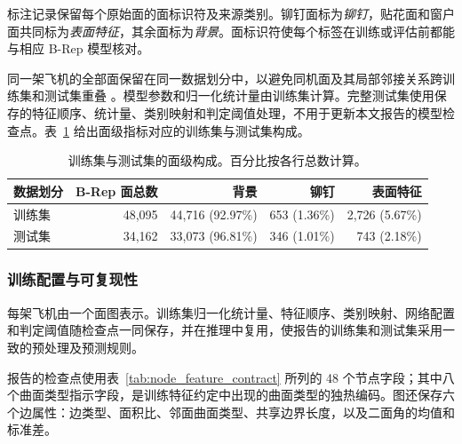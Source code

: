 \documentclass[12pt,a4paper]{ctexart}
\begin{document}
标注记录保留每个原始面的面标识符及来源类别。铆钉面标为\textit{铆钉}，贴花面和窗户面共同标为\textit{表面特征}，其余面标为\textit{背景}。面标识符使每个标签在训练或评估前都能与相应 B-Rep 模型核对。

同一架飞机的全部面保留在同一数据划分中，以避免同机面及其局部邻接关系跨训练集和测试集重叠 \parencite{kapoor2023leakage}。模型参数和归一化统计量由训练集计算。完整测试集使用保存的特征顺序、统计量、类别映射和判定阈值处理，不用于更新本文报告的模型检查点。表~\ref{tab:data_composition} 给出面级指标对应的训练集与测试集构成。

\begin{table}[!ht]
\centering
\small
\caption{训练集与测试集的面级构成。百分比按各行总数计算。}\label{tab:data_composition}
\begin{tabular}{lrrrr}
\toprule
数据划分 & B-Rep 面总数 & 背景 & 铆钉 & 表面特征 \\
\midrule
训练集 & 48,095 & 44,716 (92.97\%) & 653 (1.36\%) & 2,726 (5.67\%) \\
测试集 & 34,162 & 33,073 (96.81\%) & 346 (1.01\%) & 743 (2.18\%) \\
\bottomrule
\end{tabular}
\end{table}

\subsubsection{训练配置与可复现性}\label{sec:training_configuration}

每架飞机由一个面图表示。训练集归一化统计量、特征顺序、类别映射、网络配置和判定阈值随检查点一同保存，并在推理中复用，使报告的训练集和测试集采用一致的预处理及预测规则。

报告的检查点使用表~\ref{tab:node_feature_contract} 所列的 48 个节点字段；其中八个曲面类型指示字段，是训练特征约定中出现的曲面类型的独热编码。图还保存六个边属性：边类型、面积比、邻面曲面类型、共享边界长度，以及二面角的均值和标准差。
\end{document}
